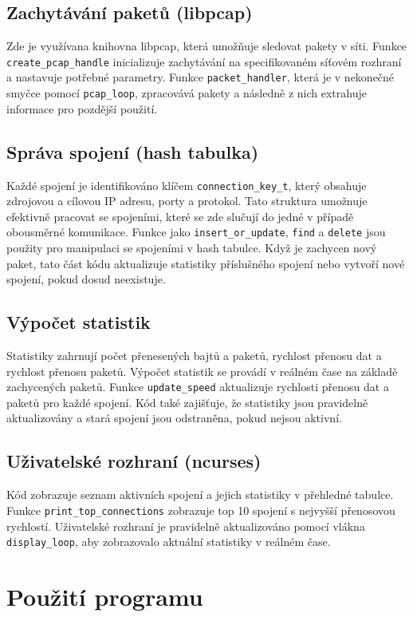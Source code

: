 \documentclass[a4paper,11pt]{article}
\theoremstyle{definition}
\begin{document}
\subsection{Zachytávání paketů (libpcap)}
Zde je využívana knihovna libpcap, která umožňuje sledovat pakety v síti. Funkce \texttt{create\_pcap\_handle} inicializuje zachytávání na specifikovaném síťovém rozhraní a nastavuje potřebné parametry. Funkce \texttt{packet\_handler}, která je v nekonečné smyčce pomocí \texttt{pcap\_loop}, zpracovává pakety a následně z nich extrahuje informace pro pozdější použití. 

\subsection{Správa spojení (hash tabulka)}
Každé spojení je identifikováno klíčem \texttt{connection\_key\_t}, který obsahuje zdrojovou a cílovou IP adresu, porty a protokol. Tato struktura umožnuje efektivně pracovat se spojeními, které se zde slučují do jedné v případě obousměrné komunikace. Funkce jako \texttt{insert\_or\_update}, \texttt{find} a \texttt{delete} jsou použity pro manipulaci se spojeními v hash tabulce. Když je zachycen nový paket, tato část kódu aktualizuje statistiky příslušného spojení nebo vytvoří nové spojení, pokud dosud neexistuje.
\subsection{Výpočet statistik}
Statistiky zahrnují počet přenesených bajtů a paketů, rychlost přenosu dat a rychlost přenosu paketů. Výpočet statistik se provádí v reálném čase na základě zachycených paketů. Funkce \texttt{update\_speed} aktualizuje rychlosti přenosu dat a paketů pro každé spojení. Kód také zajišťuje, že statistiky jsou pravidelně aktualizovány a stará spojení jsou odstraněna, pokud nejsou aktivní.

\subsection{Uživatelské rozhraní (ncurses)}
Kód zobrazuje seznam aktivních spojení a jejich statistiky v přehledné tabulce. Funkce \texttt{print\_top\_connections} zobrazuje top 10 spojení s nejvyšší přenosovou rychlostí. Uživatelské rozhraní je pravidelně aktualizováno pomocí vlákna \texttt{display\_loop}, aby zobrazovalo aktuální statistiky v reálném čase.

\section{Použití programu}
\end{document}
